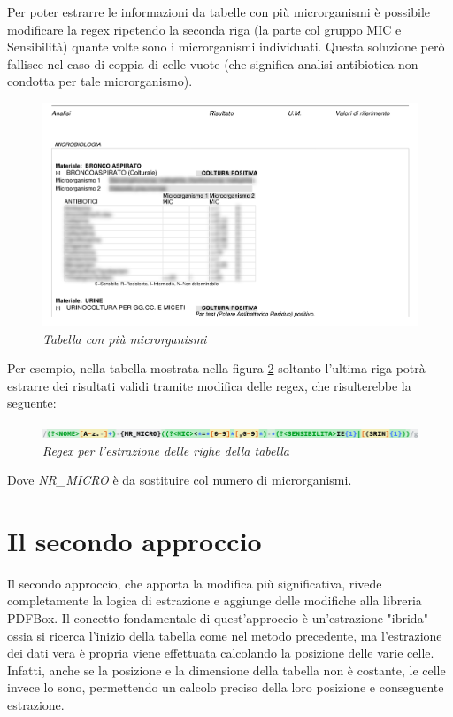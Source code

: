 Per poter estrarre le informazioni da tabelle con più microrganismi è possibile modificare la regex ripetendo la seconda riga (la parte col gruppo MIC e Sensibilità) quante volte sono i microrganismi individuati.
Questa soluzione però fallisce nel caso di coppia di celle vuote (che significa analisi antibiotica non condotta per tale microrganismo).
\newline
\begin{figure}[h!]
	\centering
	\includegraphics[width=.99\columnwidth]{images/content_multi_p1.png}
	\caption{\textit{Tabella con più microrganismi}}
	\label{fig:content_multi_1}
\end{figure}
\newline
Per esempio, nella tabella mostrata nella figura \ref{fig:content_multi_1} soltanto l'ultima riga potrà estrarre dei risultati validi tramite modifica delle regex, che risulterebbe la seguente:
\begin{figure}[h!]
	\centering
	\includegraphics[width=.99\columnwidth]{images/regex_2.png}
	\caption{\textit{Regex per l'estrazione delle righe della tabella}}
	\label{fig:content_multi_1}
\end{figure}
Dove \textit{NR\_MICRO} è da sostituire col numero di microrganismi.
\section{Il secondo approccio}
Il secondo approccio, che apporta la modifica più significativa, rivede completamente la logica di estrazione e aggiunge delle modifiche alla libreria PDFBox.
Il concetto fondamentale di quest'approccio è un'estrazione "ibrida" ossia si ricerca l'inizio della tabella come nel metodo precedente, ma l'estrazione dei dati vera è propria viene effettuata calcolando la posizione delle varie celle.
\newline
Infatti, anche se la posizione e la dimensione della tabella non è costante, le celle invece lo sono, permettendo un calcolo preciso della loro posizione e conseguente estrazione.
